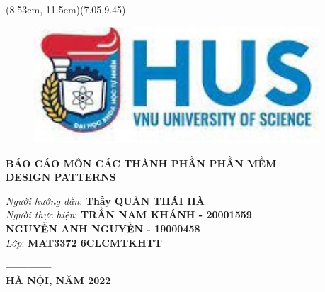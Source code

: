 \newpage
 \thispagestyle{empty}

\thisfancyput*(8.53cm,-11.5cm){\setlength{\unitlength}{2.54cm}\fancyoval(7.05,9.45)}
 \newcommand*{\Arialfont}{\fontfamily{phv}\selectfont}

\begin{titlepage}
\begin{figure}[!t]
\centering
\includegraphics[width = 4.2in]{Title/download.jpg}
\caption*{}
\end{figure}

\centering
\fontsize{16}{20}\selectfont\textbf{BÁO CÁO MÔN CÁC THÀNH PHẦN PHẦN MỀM}\\[1in]
\fontsize{24}{20}\selectfont\textbf{DESIGN PATTERNS}\\[1in]
    \begin{center}
		\fontsize{14}{20}\selectfont
		\textit{Người hướng dẫn}: 
		    \textbf{Thầy QUẢN THÁI HÀ}\\
		\textit{Người thực hiện}:
		    \textbf{TRẦN NAM KHÁNH - 20001559}\\
		    \textbf{NGUYỄN ANH NGUYỄN - 19000458}\\
		\textit{Lớp}: \textbf{MAT3372 6CLCMTKHTT}\\
	\end{center} \textbf{------------}\\[1in]
	    

\Large{\textbf{HÀ NỘI, NĂM 2022}}\\
\newpage
\end{titlepage}